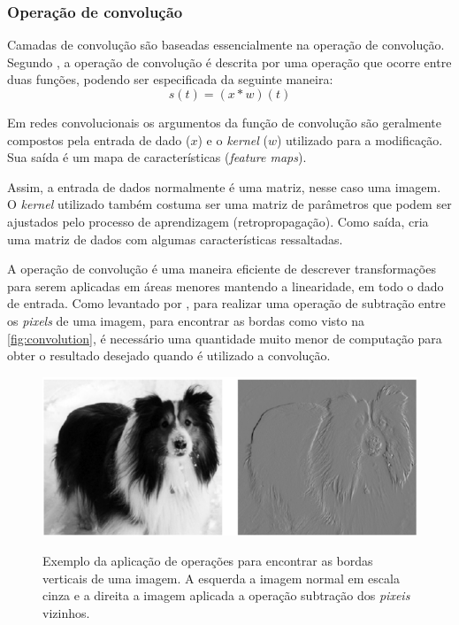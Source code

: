 \subsubsection{Operação de convolução}
Camadas de convolução são baseadas essencialmente na operação de convolução. Segundo \cite{Goodfellow-et-al-2016}, a operação de convolução é descrita por uma operação que ocorre entre duas funções, podendo ser especificada da seguinte maneira:\[s(t) = (x*w)(t)\] %


Em redes convolucionais os argumentos da função de convolução são geralmente compostos pela entrada de dado ($x$) e o \textit{kernel} ($w$) utilizado para a modificação. Sua saída é um mapa de características (\textit{feature maps}).

\par Assim, a entrada de dados normalmente é uma matriz, nesse caso uma imagem. O \textit{kernel} utilizado também costuma ser uma matriz de parâmetros que podem ser ajustados pelo processo de aprendizagem (retropropagação). Como saída, cria uma matriz de dados com algumas características ressaltadas.

\par A operação de convolução é uma maneira eficiente de descrever transformações para serem aplicadas em áreas menores mantendo a linearidade, em todo o dado de entrada. Como levantado por , para realizar uma operação de subtração entre os \textit{pixels} de uma imagem, para encontrar as bordas como visto na \autoref{fig:convolution}, é necessário uma quantidade muito menor de computação para obter o resultado desejado quando é utilizado a convolução.

\begin{figure}[H]
  \centering
  \caption{Exemplo da aplicação de operações para encontrar as bordas verticais de uma imagem. A esquerda a imagem normal em escala cinza e a direita a imagem aplicada a operação subtração dos \textit{pixeis} vizinhos.}
  \includegraphics[width=400pt]{dados/figuras/convolution}
  \label{fig:convolution}
\end{figure}


